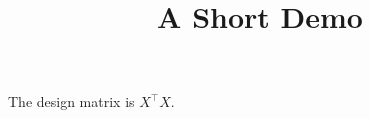 \documentclass[article]{jss}
\title{A Short Demo}
\begin{document}
The design matrix is $X^\top X$.
\end{document}
